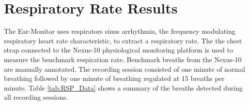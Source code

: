 
\section{Respiratory Rate Results}
The Ear-Monitor uses respirators sinus arrhythmia, the frequency modulating respiratory heart rate characteristic, to extract a respiratory rate. The the chest strap connected to the Nexus-10 physiological monitoring platform is used to measure the benchmark respiration rate. Benchmark breaths from the Nexus-10 are manually annotated. The recording session consisted of one minute of normal breathing followed by one minute of breathing regulated at 15 breaths per minute. Table \ref{tab:RSP_Data} shows a summary of the breaths detected during all recording sessions.%

